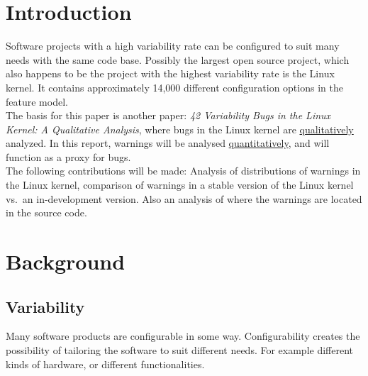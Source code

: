 \documentclass[a4paper,11pt]{report}
\begin{document}
\chapter{Introduction}
Software projects with a high variability rate can be configured to suit many
needs with the same code base. Possibly the largest open source project, which 
also happens to be the project with the highest variability rate
is the Linux kernel. It contains approximately 14,000 different configuration 
options in the feature model.
\\

The basis for this paper is another  paper: \emph{42 Variability 
Bugs in the Linux Kernel: A Qualitative Analysis}\cite{42bugs}, where bugs in 
the Linux kernel are \underline{qualitatively} analyzed. In this report, warnings will be 
analysed \underline{quantitatively}, and will function as a proxy for bugs.
\\

The following contributions will be made: Analysis of distributions of warnings 
in the Linux kernel, comparison of warnings in a stable version of the Linux 
kernel vs.\ an in-development version. Also an analysis of where the warnings 
are located in the source code.

\newpage
        \chapter{Background}

            \section{Variability}

Many software products are configurable in some way. Configurability creates the 
possibility of tailoring the software to suit different needs. For example 
different kinds of hardware, or different functionalities. 
\\
\end{document}
